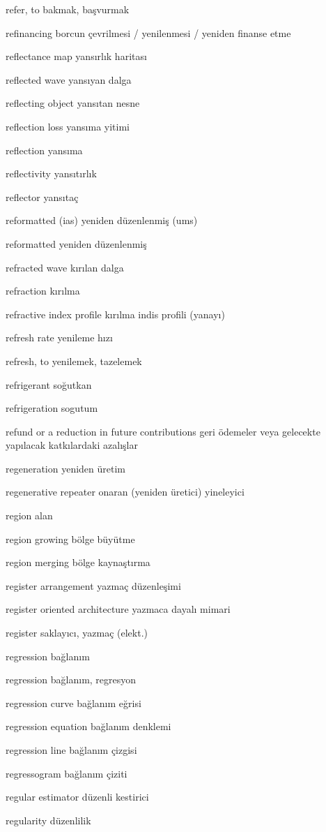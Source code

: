 \documentclass[12pt,fleqn]{article}\usepackage{../../common}
\begin{document}
refer, to bakmak, başvurmak

refinancing borcun çevrilmesi / yenilenmesi / yeniden finanse etme

reflectance map yansırlık haritası

reflected wave yansıyan dalga

reflecting object yansıtan nesne

reflection loss yansıma yitimi

reflection yansıma

reflectivity yansıtırlık

reflector yansıtaç

reformatted (ias) yeniden düzenlenmiş (ums)

reformatted yeniden düzenlenmiş

refracted wave kırılan dalga

refraction kırılma

refractive index profile kırılma indis profili (yanayı)

refresh rate yenileme hızı

refresh, to yenilemek, tazelemek

refrigerant soğutkan

refrigeration sogutum

refund or a reduction in future contributions geri ödemeler veya gelecekte yapılacak katkılardaki azalışlar

regeneration yeniden üretim

regenerative repeater onaran (yeniden üretici) yineleyici

region alan

region growing bölge büyütme

region merging bölge kaynaştırma

register arrangement yazmaç düzenleşimi

register oriented architecture yazmaca dayalı mimari

register saklayıcı, yazmaç (elekt.)

regression bağlanım

regression bağlanım, regresyon

regression curve bağlanım eğrisi

regression equation bağlanım denklemi

regression line bağlanım çizgisi

regressogram bağlanım çiziti

regular estimator düzenli kestirici

regularity düzenlilik
\end{document}
